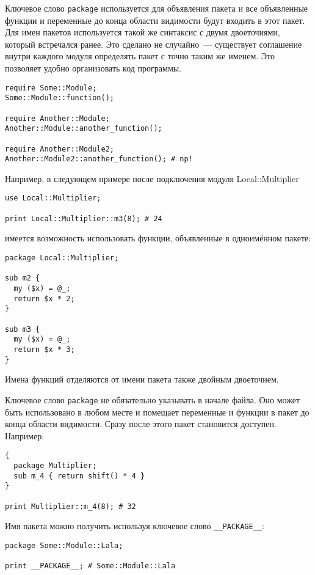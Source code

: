 Ключевое слово \verb|package| используется для объявления пакета и все объявленные функции и переменные до конца области видимости будут входить в этот пакет.
Для имен пакетов используется такой же синтаксис с двумя двоеточиями, который встречался ранее. Это сделано не случайно~--- существует соглашение внутри каждого модуля определять пакет с точно таким же именем. Это позволяет удобно организовать код программы.
\begin{verbatim}
require Some::Module;
Some::Module::function();

require Another::Module;
Another::Module::another_function();

require Another::Module2;
Another::Module2::another_function(); # np!
\end{verbatim}

Например, в следующем примере после подключения модуля Local::Multiplier
\begin{verbatim}
use Local::Multiplier;

print Local::Multiplier::m3(8); # 24
\end{verbatim}
имеется возможность использовать функции, объявленные в одноимённом пакете:
\begin{verbatim}
package Local::Multiplier;

sub m2 {
  my ($x) = @_;
  return $x * 2;
}

sub m3 {
  my ($x) = @_;
  return $x * 3;
}
\end{verbatim}
Имена функций отделяются от имени пакета также двойным двоеточием.

Ключевое слово \verb|package| не обязательно указывать в начале файла. Оно может быть использовано в любом месте и помещает переменные и функции в пакет до конца области видимости. Сразу после этого пакет становится доступен. Например:
\begin{verbatim}
{
  package Multiplier;
  sub m_4 { return shift() * 4 }
}

print Multiplier::m_4(8); # 32
\end{verbatim}
 Имя пакета можно получить используя ключевое слово \verb|__PACKAGE__|:
\begin{verbatim}
package Some::Module::Lala;

print __PACKAGE__; # Some::Module::Lala
\end{verbatim}

